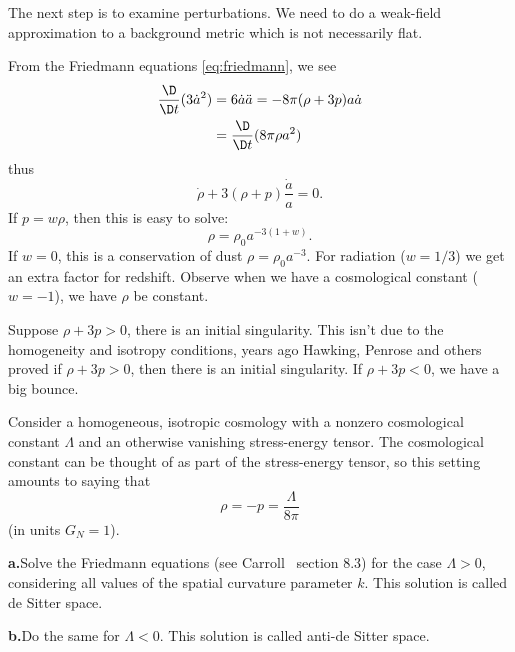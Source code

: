 The next step is to examine
perturbations. We need to do a weak-field approximation to a
background metric which is not necessarily flat.

From the Friedmann equations \eqref{eq:friedmann}, we see
\begin{equation}
\begin{aligned}
\frac{\D}{\D t}(3\dot{a}^{2}) 
&= 6\dot{a}\ddot{a} = -8\pi(\rho+3p)a\dot{a}\\
&=\frac{\D}{\D t}(8\pi\rho a^{2})
\end{aligned}
\end{equation}
thus
\begin{equation}
\dot{\rho}+3(\rho+p)\frac{\dot{a}}{a}=0.
\end{equation}
If $p=w\rho$, then this is easy to solve:
\begin{equation}
\rho=\rho_{0}a^{-3(1+w)}.
\end{equation}
If $w=0$, this is a conservation of dust
$\rho=\rho_{0}a^{-3}$. For radiation ($w=1/3$) we get an extra
factor for redshift. Observe when we have a cosmological constant
($w=-1$), we have $\rho$ be constant.

Suppose $\rho+3p>0$, there is an initial singularity. This isn't
due to the homogeneity and isotropy conditions, years ago
Hawking, Penrose and others proved if $\rho+3p>0$, then there is
an initial singularity. If $\rho+3p<0$, we have a big bounce.

\begin{exercises}
\begin{xca}
Consider a homogeneous, isotropic cosmology with a nonzero
cosmological constant $\Lambda$ and an otherwise vanishing
stress-energy tensor. The cosmological constant can be thought of
as part of the stress-energy tensor, so this setting amounts to
saying that
\begin{equation*}
\rho =-p=\frac{\Lambda}{8\pi}
\end{equation*}
(in units $G_{N} = 1$).

\noindent\textbf{a.\quad}\ignorespaces Solve the Friedmann
equations (see Carroll~\cite{Carroll:2004st} section 8.3) for the case $\Lambda>0$,
considering all values of the spatial curvature parameter
$k$. This solution is called de Sitter space.

\noindent\textbf{b.\quad}\ignorespaces Do the same for
$\Lambda<0$. This solution is called anti-de Sitter space. 
\end{xca}
\end{exercises}

